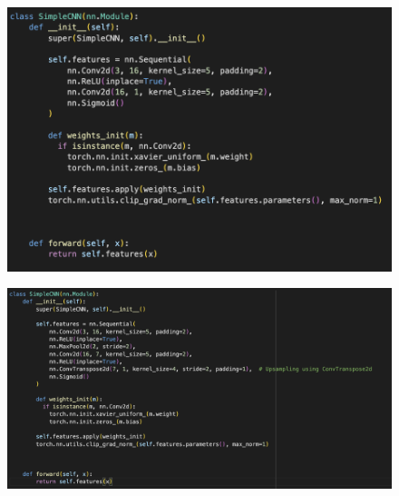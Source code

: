 \documentclass[a4paper,12pt]{extarticle}
\begin{document}
\begin{figure}[H]
    \centering
    \includegraphics[width=\linewidth]{CNN simple model.png}
    \label{fig:simple-CNN}
\end{figure}
\begin{figure}[H]
    \centering
    \includegraphics[width=\linewidth]{CNN model pooling.png}
    \label{fig:pooling-CNN}
\end{figure}
\end{document}

